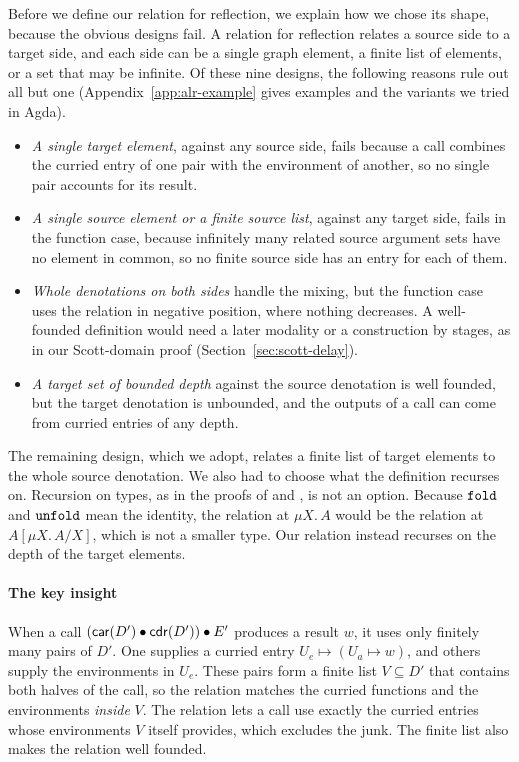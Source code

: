 Before we define our relation for reflection, we explain how we chose
its shape, because the obvious designs fail. A relation for reflection
relates a source side to a target side, and each side can be a single
graph element, a finite list of elements, or a set that may be
infinite. Of these nine designs, the following reasons rule out all
but one (Appendix~\ref{app:alr-example} gives
examples and the variants we tried in Agda).
\begin{itemize}
\item \emph{A single target element}, against any source side, fails
  because a call combines the curried entry of one pair with the
  environment of another, so no single pair accounts for its result.
\item \emph{A single source element or a finite source list}, against
  any target side, fails in the function case, because infinitely many related
  source argument sets have no element in common, so no finite source
  side has an entry for each of them.
\item \emph{Whole denotations on both sides} handle the mixing, but the
  function case uses the relation in negative position, where nothing
  decreases. A well-founded definition would need a later modality or
  a construction by stages, as in our Scott-domain proof
(Section~\ref{sec:scott-delay}).
\item \emph{A target set of bounded depth} against the source
  denotation is well founded, but the target denotation is unbounded,
  and the outputs of a call can come from curried entries of any depth.
\end{itemize}
The remaining design, which we adopt, relates a finite list of target
elements to the whole source denotation. We also had to choose what
the definition recurses on. Recursion on types, as in the proofs of
\citet{Chlipala:2007fk} and \citet{Nielsen:2000aa}, is not an option.
Because $\mathtt{fold}$ and $\mathtt{unfold}$ mean the identity, the relation at
$\mu X.\,A$ would be the relation at $A[\mu X.\,A/X]$, which is not a smaller type. Our relation instead recurses on the depth of the target elements.

\paragraph{The key insight}

When a call $(\mathsf{car}(D') \mathbin{\bullet} \mathsf{cdr}(D')) \mathbin{\bullet} E'$ produces a result $w$, it uses only
finitely many pairs of $D'$. One supplies a curried entry
$U_e \mapsto (U_a \mapsto w)$, and others supply the environments in
$U_e$. These pairs form a finite list $V \subseteq D'$ that contains
both halves of the call, so the relation matches the curried functions and the environments \emph{inside} $V$. The relation lets a call use exactly the curried
entries whose environments $V$ itself provides, which excludes the
junk. The finite list also makes the relation well founded.

